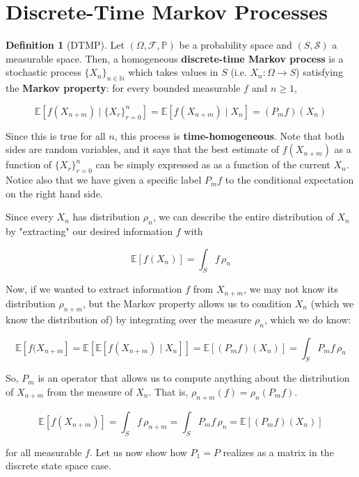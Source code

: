 \documentclass{article}
\theoremstyle{definition}
\theoremstyle{remark}
\theoremstyle{definition}
\newtheorem{definition}{Definition}[section]
\begin{document}
\section{Discrete-Time Markov Processes}

  \begin{definition}[DTMP]
    Let $(\Omega, \mathcal{F}, \mathbb{P})$ be a probability space and $(S, \mathcal{S})$ a measurable space. Then, a homogeneous \textbf{discrete-time Markov process} is a stochastic process $\{X_n\}_{n \in \mathbb{N}}$ which takes values in $S$ (i.e. $X_n: \Omega \rightarrow S$) satisfying the \textbf{Markov property}: for every bounded measurable $f$ and $n \geq 1$, 

      \[\mathbb{E}[f(X_{n + m}) \mid \{X_r\}_{r=0}^n] = \mathbb{E}[f (X_{n + m}) \mid X_n] = (P_m f) (X_n)\]

    Since this is true for all $n$, this process is \textbf{time-homogeneous}. Note that both sides are random variables, and it says that the best estimate of $f(X_{n+m})$ as a function of $\{X_r\}_{r=0}^n$ can be simply expressed as as a function of the current $X_n$. Notice also that we have given a specific label $P_m f$ to the conditional expectation on the right hand side. 
  \end{definition}

  Since every $X_n$ has distribution $\rho_n$, we can describe the entire distribution of $X_n$ by "extracting" our desired information $f$ with 

    \[\mathbb{E}[f(X_n)] = \int_S f \, \rho_n\]

  Now, if we wanted to extract information $f$ from $X_{n + m}$, we may not know its distribution $\rho_{n + m}$, but the Markov property allows us to condition $X_n$ (which we know the distribution of) by integrating over the measure $\rho_n$, which we do know: 

    \[\mathbb{E}[f(X_{n + m}] = \mathbb{E}[ \mathbb{E}[f(X_{n + m}) \mid X_n]] = \mathbb{E}[(P_m f) (X_n)] = \int_S P_m f \, \rho_n\]

  So, $P_m$ is an operator that allows us to compute anything about the distribution of $X_{n + m}$ from the measure of $X_n$. That is, $\rho_{n + m} (f) = \rho_n (P_m f)$. 

    \[\mathbb{E}[f(X_{n + m})] = \int_S f \, \rho_{n + m} = \int_S P_m f \, \rho_n = \mathbb{E}[ (P_m f) (X_n)]\] 

  for all measurable $f$. Let us now show how $P_1 = P$ realizes as a matrix in the discrete state space case. 
\end{document}
